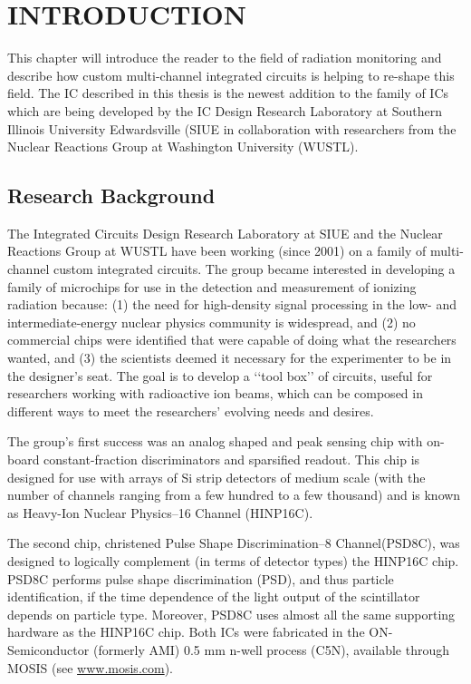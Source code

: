 \documentclass[12pt,oneside,final]{siuethesis}
\theoremstyle{definition}
\begin{document}

\chapter{INTRODUCTION}  %

This chapter will introduce the reader to the field of radiation monitoring and describe how custom multi-channel integrated circuits is helping to re-shape this field.  The IC described in this thesis is the newest addition to the family of ICs which are being developed by the IC Design Research Laboratory at Southern Illinois University Edwardsville (SIUE in collaboration with researchers from the Nuclear Reactions Group at Washington University (WUSTL).

\section{Research Background}

The Integrated Circuits Design Research Laboratory at SIUE and the Nuclear Reactions Group at WUSTL have been working (since 2001) on a family of multi-channel custom integrated circuits.  The group became interested in developing a family of microchips for use in the detection and measurement of ionizing radiation because: (1) the need for high-density signal processing in the low- and intermediate-energy nuclear physics community is widespread, and (2) no commercial chips were identified that were capable of doing what the researchers wanted, and (3) the scientists deemed it necessary for the experimenter to be in the designer’s seat. The goal is to develop a ‘‘tool box’’ of circuits,
useful for researchers working with radioactive ion beams, which can be composed in different ways to meet the researchers’ evolving needs and desires.

 
The group’s first success was an analog shaped and peak sensing chip with on-board constant-fraction discriminators and
sparsified readout. This chip is designed for use with arrays of Si strip detectors of medium scale (with the number of channels ranging from a few hundred to a few thousand) and is known as Heavy-Ion Nuclear Physics–16 Channel (HINP16C). 

The second chip, christened Pulse Shape Discrimination–8 Channel(PSD8C), was designed to logically complement (in terms of detector types) the HINP16C chip. PSD8C performs pulse shape discrimination (PSD), and thus particle identification, if the time dependence of the light output of the scintillator depends on particle type. Moreover, PSD8C uses almost all the same supporting hardware as the HINP16C chip. Both ICs were fabricated in the ON-Semiconductor (formerly AMI) 0.5 mm n-well process (C5N), available through MOSIS (see \url{www.mosis.com}).
\end{document}
